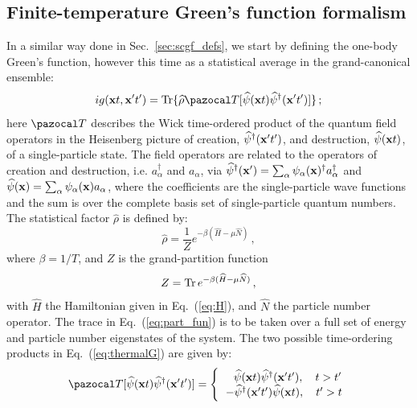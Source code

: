 \subsection{Finite-temperature Green's function formalism}
In a similar way done in Sec.~\ref{sec:scgf_defs}, we start by defining the one-body Green's function, however this time as a statistical average in the grand-canonical ensemble:
\begin{equation}
\label{eq:thermalG}
ig({\bf x}t, {\bf x'}t')= {\rm Tr}\{\widehat{\rho}{\pazocal T}[\widehat\psi({\bf x}t) \widehat\psi^\dagger({\bf x'}t')]\}\,;
\end{equation}
here ${\pazocal T}$ describes the Wick time-ordered product of the quantum field operators in the Heisenberg picture of creation, $\widehat\psi^\dagger({\bf x'}t')$, and destruction, $\widehat\psi({\bf x}t)$, of a single-particle state. The field operators are related to the operators of creation and destruction, i.e. $a^\dagger_\alpha$ and $a_\alpha$, via $\widehat\psi^\dagger({\bf x'})=\sum_\alpha\psi_\alpha({\bf x})^\dagger a^\dagger_\alpha$ and $\widehat\psi({\bf x})=\sum_\alpha\psi_\alpha({\bf x}) a_\alpha$, where the coefficients are the single-particle wave functions and the sum is over the complete basis set of single-particle quantum numbers. The statistical factor $\widehat \rho$ is defined by:
\begin{equation}
\widehat \rho=\frac{1}{Z}e^{-\beta(\widehat H -\mu\widehat N)}\,,
\end{equation}
where $\beta=1/T$, and $Z$ is the grand-partition function
\begin{equation}
\label{eq:part_fun}
Z={\rm Tr}\,e^{-\beta(\widehat H -\mu\widehat N)}\,,
\end{equation}
with $\widehat H$ the Hamiltonian given in Eq.~(\ref{eq:H}), and $\widehat N$ the particle number operator. The trace in Eq.~(\ref{eq:part_fun}) is to be taken over a full set of energy and particle number eigenstates of the system. The two possible time-ordering products in Eq.~(\ref{eq:thermalG}) are given by:
\begin{equation}
\label{eq:Tproduct}
{\pazocal T}[\widehat\psi({\bf x}t) \widehat\psi^\dagger({\bf x'}t')]=
 \Bigg\{
  \begin{tabular}{c}
  \,\,\,\,$\widehat\psi({\bf x}t) \widehat\psi^\dagger({\bf x'}t'), \quad t>t'$  \\
  $-\widehat\psi^\dagger({\bf x'}t') \widehat\psi({\bf x}t), \quad t'>t$
  \end{tabular}
\end{equation}
